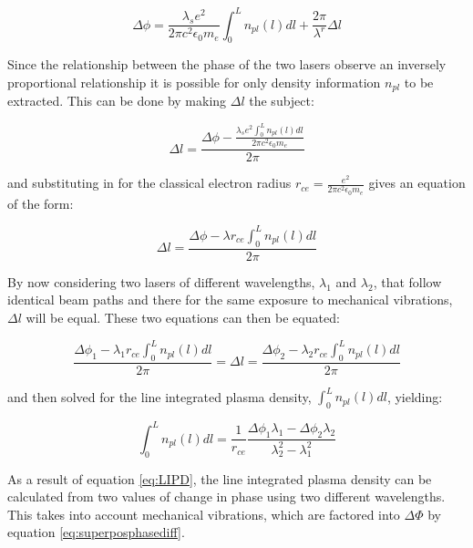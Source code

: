 \documentclass[12pt,a4paper,oneside]{report}
\begin{document}
\begin{equation}
	\Delta\phi = \frac{\lambda_{s} e^{2}}{2 \pi c^{2} \epsilon_{0} m_{e}} \int_{0}^{L} n_{pl} (l) dl + \frac{2\pi}{\lambda^{r}} \Delta l
	\label{eq:heterophasediff}
\end{equation}

Since the relationship between the phase of the two lasers observe an inversely proportional relationship it is possible for only density information $n_{pl}$ to be extracted. This can be done by making $\Delta l$ the subject:

\begin{equation}
	\Delta l = \frac{\Delta\phi - \frac{\lambda _{s} e^{2} \int_{0}^{L} n_{pl} (l) dl }{2 \pi c^{2} \epsilon_{0} m_{e}}}{2 \pi} 
	\label{eq:deltal}
\end{equation}

and substituting in for the classical electron radius $r_{ce} = \frac{e^{2}}{2 \pi c^{2} \epsilon_{0} m_{e}}$ gives an equation of the form:

\begin{equation}
	\Delta l = \frac{\Delta\phi - \lambda r_{ce} \int_{0}^{L} n_{pl} (l) dl}{2 \pi}  
	\label{eq:deltalrce}
\end{equation}

By now considering two lasers of different wavelengths, $\lambda _{1}$ and $\lambda _{2}$, that follow identical beam paths and there for the same exposure to mechanical vibrations, $\Delta l$ will be equal. These two equations can then be equated:

\begin{equation}
	\frac{\Delta\phi _{1} - \lambda _{1} r_{ce} \int_{0}^{L} n_{pl} (l) dl}{2 \pi}  = \Delta l = \frac{\Delta\phi _{2} - \lambda _{2} r_{ce} \int_{0}^{L} n_{pl} (l) dl}{2 \pi}  	\label{eq:deltalequate}
\end{equation}

and then solved for the line integrated plasma density, $\int_{0}^{L} n_{pl} (l) dl$, yielding:

\begin{equation}
\int_{0}^{L} n_{pl} (l) dl = \frac{1}{r_{ce}} \frac{\Delta\phi _{1} \lambda _{1} - \Delta\phi _{2} \lambda _{2}}{\lambda _{2}^{2} - \lambda _{1}^{2}}	
    \label{eq:LIPD}
\end{equation}

As a result of equation \ref{eq:LIPD}, the line integrated plasma density can be calculated from two values of change in phase using two different wavelengths. This takes into account mechanical vibrations, which are factored into $\Delta \Phi$ by equation \ref{eq:superposphasediff}.
\end{document}
